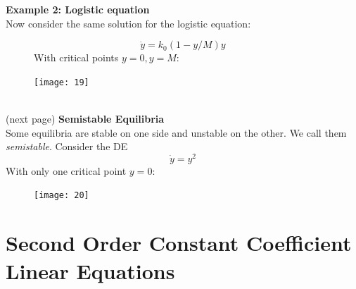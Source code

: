 \documentclass{report}
\begin{document}
\textbf{Example 2: Logistic equation}\\
Now consider the same solution for the logistic equation:
\begin{figure}[h]
\begin{equation*}
\dot{y}=k_0(1-y/M)y
\end{equation*}
With critical points $y=0,y=M$:
\begin{center}
\texttt{[image: 19]}\\
\end{center}
\end{figure}\\
(next page)
\newpage
\noindent\textbf{Semistable Equilibria}\\
Some equilibria are stable on one side and unstable on the other. We call them \textit{semistable}. 
Consider the DE
\begin{equation*}
\dot{y}=y^2
\end{equation*}
With only one critical point $y=0$:
\begin{figure}[h]
\begin{center}
\texttt{[image: 20]}\\
\end{center}
\end{figure}
\newpage

\section{Second Order Constant Coefficient Linear Equations}
\end{document}
